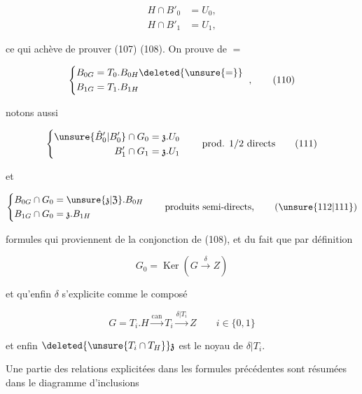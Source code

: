 \[\begin{aligned}
H\cap B'_0&=U_0,\\
H\cap B'_1&=U_1,
\end{aligned}\tag*{(109)}\]

 ce qui achève de prouver (107) (108). On prouve de $=$

\[\left\{\begin{aligned}
B_{0G}&=T_0.B_{0H}\deleted{\unsure{=}}\\
B_{1G}&=T_{1}.B_{1H}
\end{aligned}\right.\ ,\tag*{(110)}\]

notons aussi

\[\left\{\begin{aligned}
\unsure{\hat B'_0|B'_0}\cap G_0&=\mathfrak{z}.U_0\\
B'_1\cap G_1&=\mathfrak{z}.U_1
\end{aligned}\right.\qquad\text{prod. }1/2\text{ directs}\tag*{(111)}\]


et

\[\left\{\begin{aligned}
B_{0G}\cap G_0&=\unsure{\mathfrak{z}|\mathfrak{Z}}.B_{0H}\\
B_{1G}\cap G_0&=\mathfrak{z}.B_{1H}
\end{aligned}\right.\qquad\text{produits semi-directs},\tag*{(\unsure{112|111})}\]

formules qui proviennent de la conjonction de (108), et du fait que par définition

\[G_0=\operatorname{Ker}(G\xrightarrow{\delta}Z)\]

et qu'enfin $\delta$ s'explicite comme le composé

\[G=T_i.H\xrightarrow{\mathrm{can}}T_i\xrightarrow{\delta|T_i}Z\qquad i\in\{0,1\}\]

et  enfin $\deleted{\unsure{T_i\cap T_H}}\mathfrak{z}$ est le noyau de $\delta|T_i$.

Une partie des relations explicitées dans les formules précédentes sont résumées dans le diagramme d'inclusions


